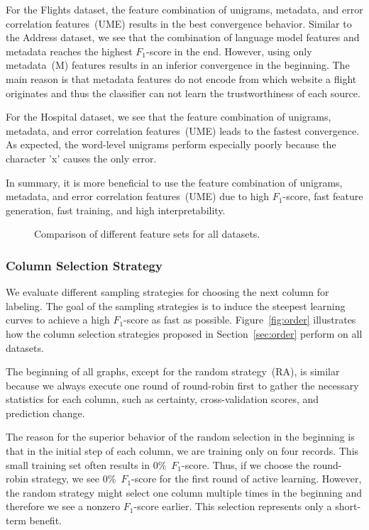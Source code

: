 For the Flights dataset, the feature combination of unigrams, metadata, and error correlation features~(UME) results in the best convergence behavior. Similar to the Address dataset, we see that the combination of language model features and metadata reaches the highest $F_1$-score in the end.
However, using only metadata~(M) features results in an inferior convergence in the beginning. The main reason is that metadata features do not encode from which website a flight originates and thus the classifier can not learn the trustworthiness of each source.

For the Hospital dataset, we see that the feature combination of unigrams, metadata, and error correlation features~(UME) leads to the fastest convergence. As expected, the word-level unigrams perform especially poorly because the character 'x' causes the only error.

In summary, it is more beneficial to use the feature combination of unigrams, metadata, and error correlation features~(UME) due to high $F_1$-score, fast feature generation, fast training, and high interpretability.

\begin{figure*}[h!]
	\centering
	
	\caption{Comparison of different feature sets for all datasets.} 
    \label{fig:features}
\end{figure*}


\subsubsection{Column Selection Strategy}
\label{subsec:orderstrategy}

We evaluate different sampling strategies for choosing the next column for labeling. The goal of the sampling strategies is to induce the steepest learning curves to achieve a high $F_1$-score as fast as possible. 
Figure~\ref{fig:order} illustrates how the column selection strategies proposed in Section~\ref{sec:order} perform on all datasets. 

The beginning of all graphs, except for the random strategy~(RA), is similar because we always execute one round of round-robin first to gather the necessary statistics for each column, such as certainty, cross-validation scores, and prediction change.


The reason for the superior behavior of the random selection in the beginning is that in the initial step of each column, we are training only on four records. This small training set often results in 0\%~$F_1$-score. Thus, if we choose the round-robin strategy, we see 0\%~$F_1$-score for the first round of active learning. However, the random strategy might select one column multiple times in the beginning and therefore we see a nonzero $F_1$-score earlier. This selection represents only a short-term benefit.

